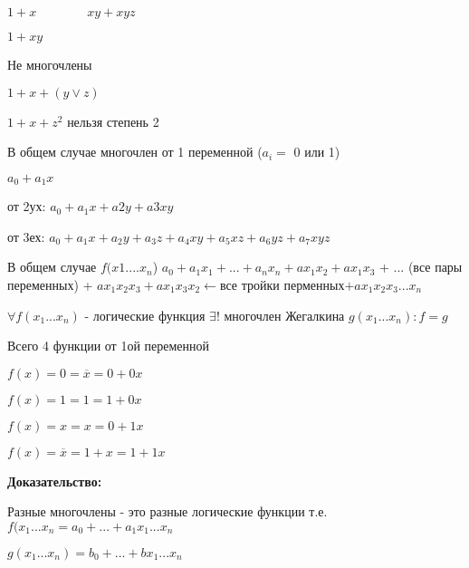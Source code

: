 \documentclass[russian]{lecture-notes}
\begin{document}
\begin{sloppypar}
\begin{proposition}
\begin{example}
        $1 + x \qquad \qquad xy+xyz$
        
        $1 + xy$
    \end{example}
    
    Не многочлены
    
    $1 + x + (y \lor z)$
    
    $1 + x + z^{2}$ нельзя степень 2
    
    
    \begin{remark}
        В общем случае многочлен от 1 переменной ($a_{i} =$ 0 или 1)
        
        $a_{0} + a_{1}x$
        
        от 2ух: $a_{0} + a_{1}x+a{2}y+a{3}xy$
        
        от 3ех: $a_{0} + a_{1}x + a_{2}y + a_{3}z + a_{4}xy + a_{5}xz + a_{6}yz + a_{7}xyz$
        
        \end{remark}
        
        В общем случае $f(x1....x_{n}$) $a_{0} + a_{1}x_{1} + ... + a_{n}x_{n} + ax_{1}x_{2} + ax_{1}x_{3}$ + ... (все пары переменных) + $ ax_{1}x_{2}x_{3}+ax_{1}x_{3}x_{2} \leftarrow $все тройки перменных$ + ax_{1}x_{2}x_{3}...x_{n}$
        
        \begin{definition}
            $\forall f(x_{1}...x_{n})$ - логические функция $\exists!$ многочлен Жегалкина $g(x_{1}...x_{n}) : f = g$
        \end{definition}
        
        \begin{remark}
            Всего 4 функции от 1ой переменной
            
            $f(x) = 0 = \overline{x} = 0 + 0x$
            
            $f(x) = 1 = 1 = 1 + 0x$
            
            $f(x) = x = x = 0 + 1x$
            
           $f(x) = \overline{x} = 1 + x = 1 + 1x$
        \end{remark}
    
    \textbf{Доказательство:}
    
        \begin{definition}
            Разные многочлены - это разные логические функции т.е. $f(x_{1} ... x_{n} = a_{0} + ... + a_{1}x_{1} ... x_{n}$
            
            $g(x_{1}...x_{n}) = b_{0} + ... + bx_{1} ... x_{n}$
            

\end{definition}
\end{proposition}
\end{sloppypar}
\end{document}
